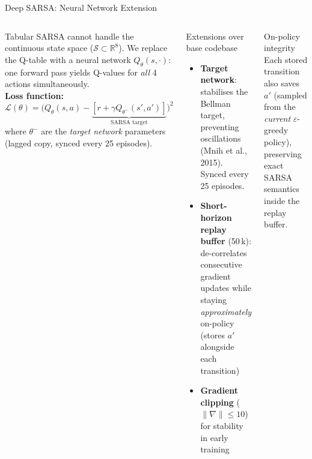 \documentclass[aspectratio=169, 10pt]{beamer}
\newcommand{\keyword}[1]{{\color{cyan}\textit{#1}}}
\begin{document}
\begin{frame}{Deep SARSA: Neural Network Extension}
  \begin{columns}[T]
      Tabular SARSA cannot handle the continuous state space
      ($\mathcal{S} \subset \mathbb{R}^8$). We replace the Q-table
      with a neural network $Q_\theta(s, \cdot)$: one forward pass
      yields Q-values for \emph{all} 4 actions simultaneously.\\[0.4em]

      \textbf{Loss function:}
      \[
        \mathcal{L}(\theta) =
        \bigl(Q_\theta(s,a) -
        \underbrace{[r + \gamma Q_{\theta^-}(s', a')]}_{\text{SARSA target}}\bigr)^2
      \]
      where $\theta^-$ are the \keyword{target network} parameters
      (lagged copy, synced every 25 episodes).

      \begin{block}{Extensions over base codebase}
        \begin{itemize}
          \item \textbf{Target network}: stabilises the Bellman
                target, preventing oscillations (Mnih et al., 2015).
                Synced every 25 episodes.
          \item \textbf{Short-horizon replay buffer} (50\,k): de-correlates
                consecutive gradient updates while staying
                \emph{approximately} on-policy (stores $a'$ alongside
                each transition)
          \item \textbf{Gradient clipping} ($\|\nabla\| \leq 10$)
                for stability in early training
        \end{itemize}
      \end{block}
      \vspace{0.3em}
      \begin{alertblock}{On-policy integrity}
        Each stored transition also saves $a'$ (sampled from the
        \emph{current} $\varepsilon$-greedy policy), preserving exact
        SARSA semantics inside the replay buffer.
      \end{alertblock}
  \end{columns}
\end{frame}
\end{document}

